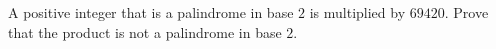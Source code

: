 A positive integer that is a palindrome in base $2$ is multiplied by $69420$. Prove that the product is not a palindrome in base $2$.

